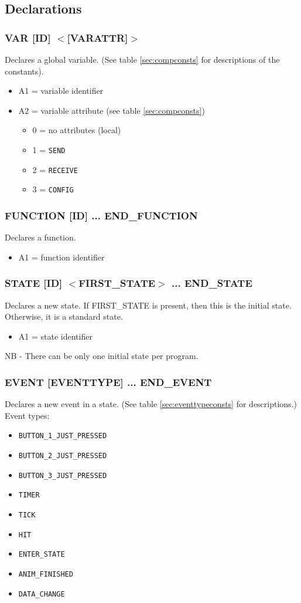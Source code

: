 \documentclass[12pt,a4paper]{scrbook}
\begin{document}
\subsection{Declarations}

\subsubsection{VAR [ID] $<$[VARATTR]$>$} 
Declares a global variable.  (See table \ref{sec:compconsts} for descriptions of the constants).
\begin{itemize}
\item A1 = variable identifier
\item A2 = variable attribute (see table \ref{sec:compconsts})
\begin{itemize}
\item 0 = no attributes (local)
\item 1 = \texttt{SEND}
\item 2 = \texttt{RECEIVE}
\item 3 = \texttt{CONFIG}
\end{itemize}
\end{itemize}

\subsubsection{FUNCTION [ID] ... END\_FUNCTION}
Declares a function.
\begin{itemize}
\item A1 = function identifier
\end{itemize}

\subsubsection{STATE [ID] $<$FIRST\_STATE$>$ ... END\_STATE}
Declares a new state.  If FIRST\_STATE is present, then this is the initial state.
Otherwise, it is a standard state.
\begin{itemize}
\item A1 = state identifier
\end{itemize}
NB - There can be only one initial state per program.

\subsubsection{EVENT [EVENTTYPE] ... END\_EVENT}
Declares a new event in a state.  (See table \ref{sec:eventtypeconsts} for descriptions.)
Event types:
\begin{itemize}
\item \texttt{BUTTON\_1\_JUST\_PRESSED}
\item \texttt{BUTTON\_2\_JUST\_PRESSED}
\item \texttt{BUTTON\_3\_JUST\_PRESSED}
\item \texttt{TIMER}
\item \texttt{TICK}
\item \texttt{HIT}
\item \texttt{ENTER\_STATE}
\item \texttt{ANIM\_FINISHED}
\item \texttt{DATA\_CHANGE}
\end{itemize}
\end{document}
